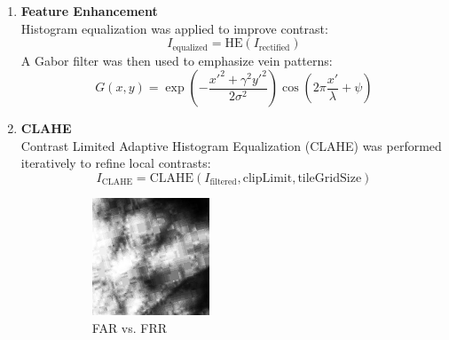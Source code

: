 \begin{enumerate}
    \item \textbf{Feature Enhancement} \\
    Histogram equalization was applied to improve contrast:
    \[
    I_{\text{equalized}} = \text{HE}(I_{\text{rectified}})
    \]
    A Gabor filter was then used to emphasize vein patterns:
    \[
    G(x, y) = \exp\left(-\frac{x'^2 + \gamma^2 y'^2}{2\sigma^2}\right) \cos\left(2\pi\frac{x'}{\lambda} + \psi\right)
    \]

    \item \textbf{CLAHE} \\
    Contrast Limited Adaptive Histogram Equalization (CLAHE) was performed iteratively to refine local contrasts:
    \[
    I_{\text{CLAHE}} = \text{CLAHE}(I_{\text{filtered}}, \text{clipLimit}, \text{tileGridSize})
    \]

    \begin{figure}[!ht]
        \centering
        \begin{subfigure}[t]{0.48\columnwidth}
            \includegraphics[width=\textwidth]{./images/preprocessing/rectified_image_equalized.png}
            \caption{FAR vs. FRR}
            \label{fig:far_vs_frr}
        \end{subfigure}
        \hfill
        \begin{subfigure}[t]{0.48\columnwidth}

\end{subfigure}
\end{figure}
\end{enumerate}
